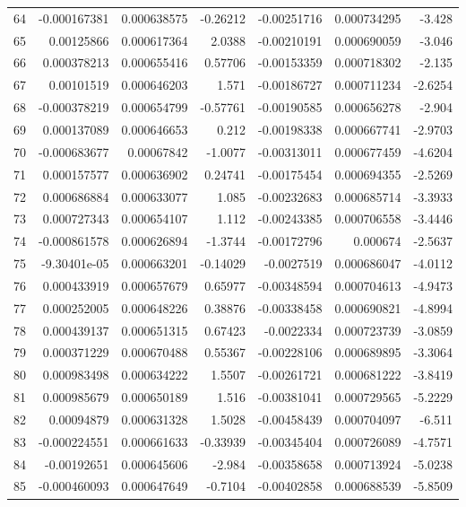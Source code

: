 \documentclass[10pt]{article}
\begin{document}
\begin{longtable}{rrrrrrr}
64 & -0.000167381 & 0.000638575 & -0.26212 & -0.00251716 & 0.000734295 & -3.428 \\
65 & 0.00125866 & 0.000617364 & 2.0388 & -0.00210191 & 0.000690059 & -3.046 \\
66 & 0.000378213 & 0.000655416 & 0.57706 & -0.00153359 & 0.000718302 & -2.135 \\
67 & 0.00101519 & 0.000646203 & 1.571 & -0.00186727 & 0.000711234 & -2.6254 \\
68 & -0.000378219 & 0.000654799 & -0.57761 & -0.00190585 & 0.000656278 & -2.904 \\
69 & 0.000137089 & 0.000646653 & 0.212 & -0.00198338 & 0.000667741 & -2.9703 \\
70 & -0.000683677 & 0.00067842 & -1.0077 & -0.00313011 & 0.000677459 & -4.6204 \\
71 & 0.000157577 & 0.000636902 & 0.24741 & -0.00175454 & 0.000694355 & -2.5269 \\
72 & 0.000686884 & 0.000633077 & 1.085 & -0.00232683 & 0.000685714 & -3.3933 \\
73 & 0.000727343 & 0.000654107 & 1.112 & -0.00243385 & 0.000706558 & -3.4446 \\
74 & -0.000861578 & 0.000626894 & -1.3744 & -0.00172796 & 0.000674 & -2.5637 \\
75 & -9.30401e-05 & 0.000663201 & -0.14029 & -0.0027519 & 0.000686047 & -4.0112 \\
76 & 0.000433919 & 0.000657679 & 0.65977 & -0.00348594 & 0.000704613 & -4.9473 \\
77 & 0.000252005 & 0.000648226 & 0.38876 & -0.00338458 & 0.000690821 & -4.8994 \\
78 & 0.000439137 & 0.000651315 & 0.67423 & -0.0022334 & 0.000723739 & -3.0859 \\
79 & 0.000371229 & 0.000670488 & 0.55367 & -0.00228106 & 0.000689895 & -3.3064 \\
80 & 0.000983498 & 0.000634222 & 1.5507 & -0.00261721 & 0.000681222 & -3.8419 \\
81 & 0.000985679 & 0.000650189 & 1.516 & -0.00381041 & 0.000729565 & -5.2229 \\
82 & 0.00094879 & 0.000631328 & 1.5028 & -0.00458439 & 0.000704097 & -6.511 \\
83 & -0.000224551 & 0.000661633 & -0.33939 & -0.00345404 & 0.000726089 & -4.7571 \\
84 & -0.00192651 & 0.000645606 & -2.984 & -0.00358658 & 0.000713924 & -5.0238 \\
85 & -0.000460093 & 0.000647649 & -0.7104 & -0.00402858 & 0.000688539 & -5.8509 \\

\end{longtable}
\end{document}
